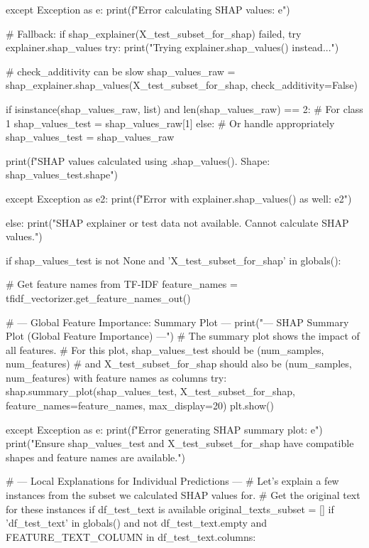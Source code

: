 \begin{ffcode}
    except Exception as e:
        print(f"Error calculating SHAP values: {e}")

        # Fallback: if shap_explainer(X_test_subset_for_shap) failed, try explainer.shap_values
        try:
        print("Trying explainer.shap_values() instead...")

        # check_additivity can be slow
        shap_values_raw = shap_explainer.shap_values(X_test_subset_for_shap, check_additivity=False)

        if isinstance(shap_values_raw, list) and len(shap_values_raw) == 2:
            # For class 1
            shap_values_test = shap_values_raw[1]
        else:
            # Or handle appropriately
            shap_values_test = shap_values_raw

        print(f"SHAP values calculated using .shap_values(). Shape: {shap_values_test.shape}")

        except Exception as e2:
            print(f"Error with explainer.shap_values() as well: {e2}")

else:
    print("SHAP explainer or test data not available. Cannot calculate SHAP values.")

if shap_values_test is not None and 'X_test_subset_for_shap' in globals():

    # Get feature names from TF-IDF
    feature_names = tfidf_vectorizer.get_feature_names_out()

    # --- Global Feature Importance: Summary Plot ---
    print("\n--- SHAP Summary Plot (Global Feature Importance) ---")
    # The summary plot shows the impact of all features.
    # For this plot, shap_values_test should be (num_samples, num_features)
    # and X_test_subset_for_shap should also be (num_samples, num_features) with feature names as columns
    try:
        shap.summary_plot(shap_values_test, X_test_subset_for_shap, feature_names=feature_names, max_display=20)
        plt.show()

    except Exception as e:
        print(f"Error generating SHAP summary plot: {e}")
        print("Ensure shap_values_test and X_test_subset_for_shap have compatible shapes and feature names are available.")

    # --- Local Explanations for Individual Predictions ---
    # Let's explain a few instances from the subset we calculated SHAP values for.
    # Get the original text for these instances if df_test_text is available
    original_texts_subset = []
    if 'df_test_text' in globals() and not df_test_text.empty and FEATURE_TEXT_COLUMN in df_test_text.columns:


\end{ffcode}
